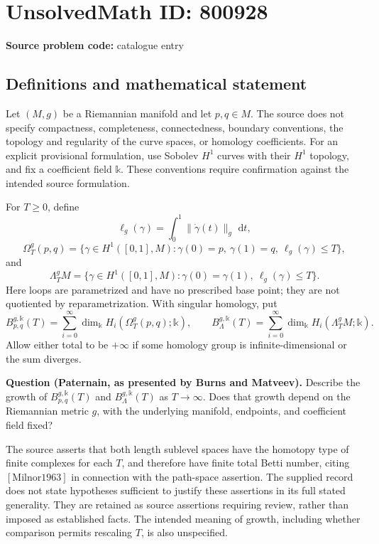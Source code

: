 \documentclass[11pt]{article}
\newcommand{\dd}{\,\mathrm{d}}
\begin{document}
\section*{UnsolvedMath ID: 800928}
\textbf{Source problem code:} catalogue entry
\subsection{Definitions and mathematical statement}
Let \((M,g)\) be a Riemannian manifold and let \(p,q\in M\). The source does not specify compactness, completeness, connectedness, boundary conventions, the topology and regularity of the curve spaces, or homology coefficients. For an explicit provisional formulation, use Sobolev \(H^1\) curves with their \(H^1\) topology, and fix a coefficient field \(\mathbb{k}\). These conventions require confirmation against the intended source formulation.

For \(T\geq 0\), define
\[
\ell_g(\gamma)=\int_0^1\lVert\dot\gamma(t)\rVert_g\,\dd t,
\]
\[
\Omega_T^g(p,q)=\{\gamma\in H^1([0,1],M):\gamma(0)=p,\ \gamma(1)=q,\ \ell_g(\gamma)\leq T\},
\]
and
\[
\Lambda_T^g M=\{\gamma\in H^1([0,1],M):\gamma(0)=\gamma(1),\ \ell_g(\gamma)\leq T\}.
\]
Here loops are parametrized and have no prescribed base point; they are not quotiented by reparametrization. With singular homology, put
\[
B_{p,q}^{g,\mathbb{k}}(T)=\sum_{i=0}^{\infty}\dim_{\mathbb{k}}H_i(\Omega_T^g(p,q);\mathbb{k}),
\qquad
B_{\Lambda}^{g,\mathbb{k}}(T)=\sum_{i=0}^{\infty}\dim_{\mathbb{k}}H_i(\Lambda_T^g M;\mathbb{k}).
\]
Allow either total to be \(+\infty\) if some homology group is infinite-dimensional or the sum diverges.

\textbf{Question (Paternain, as presented by Burns and Matveev).} Describe the growth of \(B_{p,q}^{g,\mathbb{k}}(T)\) and \(B_{\Lambda}^{g,\mathbb{k}}(T)\) as \(T\to\infty\). Does that growth depend on the Riemannian metric \(g\), with the underlying manifold, endpoints, and coefficient field fixed?

The source asserts that both length sublevel spaces have the homotopy type of finite complexes for each \(T\), and therefore have finite total Betti number, citing \([\mathrm{Milnor1963}]\) in connection with the path-space assertion. The supplied record does not state hypotheses sufficient to justify these assertions in its full stated generality. They are retained as source assertions requiring review, rather than imposed as established facts. The intended meaning of growth, including whether comparison permits rescaling \(T\), is also unspecified.
\end{document}
